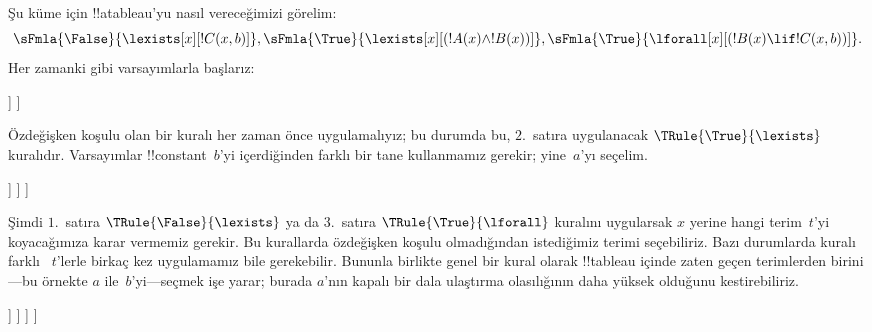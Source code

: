 \documentclass[../../../include/open-logic-section]{subfiles}
\begin{document}
\begin{ex}
Şu küme için !!a{tableau}'yu nasıl vereceğimizi görelim:
\[
\sFmla{\False}{\lexists[x][!C(x,b)]},
\sFmla{\True}{\lexists[x][(!A(x) \land !B(x))]},
\sFmla{\True}{\lforall[x][(!B(x) \lif !C(x,b))]}.
\]
Her zamanki gibi varsayımlarla başlarız:
\begin{oltableau}
  [\sFmla{\False}{\lexists[x][\formula{C}(x,b)]}, just=\TAss
    [\sFmla{\True}{\lexists[x][(\formula{A}(x) \land \formula{B}(x))]},
      just=\TAss
      [\sFmla{\True}{\lforall[x][(\formula{B}(x) \lif \formula{C}(x,b))]},
        just=\TAss]
    ]
  ]
\end{oltableau}
Özdeğişken koşulu olan bir kuralı her zaman önce uygulamalıyız; bu durumda
bu, $2$.~satıra uygulanacak $\TRule{\True}{\lexists}$ kuralıdır.
Varsayımlar !!{constant}~$b$'yi içerdiğinden farklı bir tane kullanmamız
gerekir; yine~$a$'yı seçelim.
\begin{oltableau}
  [\sFmla{\False}{\lexists[x][\formula{C}(x,b)]}, just=\TAss
    [\sFmla{\True}{\lexists[x][(\formula{A}(x) \land \formula{B}(x))]},
      just=\TAss, checked
      [\sFmla{\True}{\lforall[x][(\formula{B}(x) \lif \formula{C}(x,b))]},
        just=\TAss
        [\sFmla{\True}{\formula{A}(a) \land \formula{B}(a)},
          just={\TRule{\True}{\lexists}[2]}]
      ]
    ]
  ]
\end{oltableau}
Şimdi $1$.~satıra $\TRule{\False}{\lexists}$ ya da $3$.~satıra
$\TRule{\True}{\lforall}$ kuralını uygularsak $x$ yerine hangi terim~$t$'yi
koyacağımıza karar vermemiz gerekir. Bu kurallarda özdeğişken koşulu
olmadığından istediğimiz terimi seçebiliriz. Bazı durumlarda kuralı farklı
~$t$'lerle birkaç kez uygulamamız bile gerekebilir. Bununla birlikte genel
bir kural olarak !!{tableau} içinde zaten geçen terimlerden birini---bu
örnekte $a$ ile~$b$'yi---seçmek işe yarar; burada $a$'nın kapalı bir dala
ulaştırma olasılığının daha yüksek olduğunu kestirebiliriz.
\begin{oltableau}
  [\sFmla{\False}{\lexists[x][\formula{C}(x,b)]}, just=\TAss
    [\sFmla{\True}{\lexists[x][(\formula{A}(x) \land \formula{B}(x))]},
      just=\TAss, checked
      [\sFmla{\True}{\lforall[x][(\formula{B}(x) \lif \formula{C}(x,b))]}, just=\TAss
        [\sFmla{\True}{\formula{A}(a) \land \formula{B}(a)}, just={\TRule{\True}{\lexists}[2]}
          [\sFmla{\False}{\formula{C}(a,b)}, just={\TRule{\False}{\lexists}[1]}
            [\sFmla{\True}{\formula{B}(a) \lif \formula{C}(a,b)},
              just={\TRule{\True}{\lforall}[3]}
            ]
          ]
        ]
      ]
    ]

\end{oltableau}
\end{ex}
\end{document}
